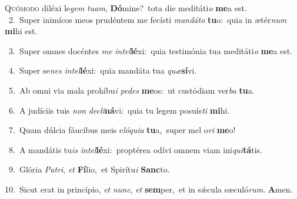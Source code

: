 \lettrine{\initial\textcolor{\initialcolor}{Q}}{uómodo} diléxi le\textit{gem} \textit{tu}\-\textit{am}, \textbf{Dó}\-mine?~\star tota die meditáti\textit{o} \textbf{me}\-a est.\\
{\numbfont\textcolor{\numbcolor}{~2.}}~Super inimícos meos prudéntem me fecísti \textit{man}\-\textit{dá}\textit{to} \textbf{tu}\-o:~\star quia in ætér\textit{num} \textbf{mi}\-hi est.\par
{\numbfont\textcolor{\numbcolor}{~3.}}~Super omnes docéntes \textit{me} \textit{in}\-\textit{tel}\textbf{lé}xi:~\star quia testimónia tua meditáti\textit{o} \textbf{me}\-a est.\par
{\numbfont\textcolor{\numbcolor}{~4.}}~Super se\textit{nes} \textit{in}\-\textit{tel}\textbf{lé}xi:~\star quia mandáta tua \textit{quæ}\-\textbf{sí}vi.\par
{\numbfont\textcolor{\numbcolor}{~5.}}~Ab omni via mala prohíbu\textit{i} \textit{pe}\-\textit{des} \textbf{me}\-os:~\star ut custódiam ver\textit{ba} \textbf{tu}\-a.\par
{\numbfont\textcolor{\numbcolor}{~6.}}~A judíciis tuis \textit{non} \textit{de}\-\textit{cli}\textbf{ná}vi:~\star quia tu legem posuís\textit{ti} \textbf{mi}\-hi.\par
{\numbfont\textcolor{\numbcolor}{~7.}}~Quam dúlcia fáucibus meis e\-\textit{ló}\-\textit{qui}\textit{a} \textbf{tu}\-a,~\star super mel o\textit{ri} \textbf{me}\-o!\par
{\numbfont\textcolor{\numbcolor}{~8.}}~A mandátis tu\textit{is} \textit{in}\-\textit{tel}\textbf{lé}xi:~\star proptérea odívi omnem viam ini\-\textit{qui}\-\textbf{tá}tis.\par
{\numbfont\textcolor{\numbcolor}{~9.}}~Glória \textit{Pa}\-\textit{tri}, \textit{et} \textbf{Fí}\-lio,~\star et Spirítu\textit{i} \textbf{Sanc}\-to.\par
{\numbfont\textcolor{\numbcolor}{10.}}~Sicut erat in princípio, \textit{et} \textit{nunc}\-, \textit{et} \textbf{sem}\-per,~\star et in sǽcula sæculó\-\textit{rum}\-. \textbf{A}\-men.\par
